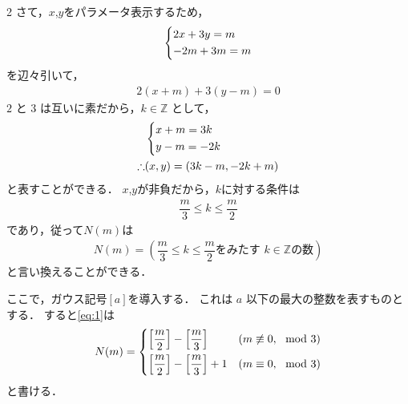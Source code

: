 \documentclass[../../main.tex]{subfiles}
\begin{document}
\begin{multicols}{2}
  さて，$x$,$y$をパラメータ表示するため，
  \begin{align}
    \begin{dcases}
      2x+3y=m \\
      -2m+3m=m
    \end{dcases}
  \end{align}
  を辺々引いて，
  \begin{align}
    2(x+m)+3(y-m)=0
  \end{align}
  $2$ と $3$ は互いに素だから，$k \in \mathbb{Z}$ として，
  \begin{align}
    &
    \begin{dcases}
      x+m = 3k \\
      y-m = -2k
    \end{dcases}         \\
    \therefore
    & (x,y) = (3k-m, -2k+m)
  \end{align}
  と表すことができる．
  $x$,$y$が非負だから，$k$に対する条件は
  \begin{align}
    \dfrac{m}{3} \le k \le \dfrac{m}{2}
  \end{align}
  であり，従って$N(m)$は
  \begin{align}
    N(m) = \left(\dfrac{m}{3} \le k \le \dfrac{m}{2} \text{をみたす } k \in \mathbb{Z} \text{の数}\right) \label{eq:1}
  \end{align}
  と言い換えることができる．

  ここで，ガウス記号$[a]$を導入する．
  これは $a$ 以下の最大の整数を表すものとする．
  すると\cref{eq:1}は
  \begin{align}
    N(m) =
    \begin{dcases}
      \left[\dfrac{m}{2}\right] - \left[\dfrac{m}{3}\right]     & (m \not\equiv 0, \mod 3) \\
      \left[\dfrac{m}{2}\right] - \left[\dfrac{m}{3}\right] + 1 & (m \equiv 0, \mod 3)
    \end{dcases}  \label{eq:2}
  \end{align}
  と書ける．


\end{multicols}
\end{document}
